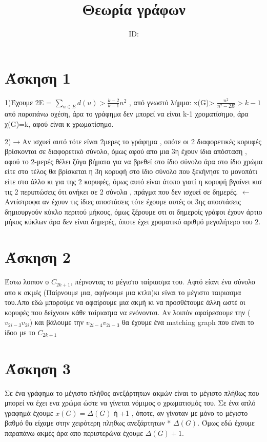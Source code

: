 \documentclass{article}
\title{Θεωρία γράφων \\ \exerciseset}
\author{\studentname \qquad  ID: \suid}
\begin{document}
\maketitle
\section*{Άσκηση 1}
1)Έχουμε 2E = $\sum_{u\in E}d(u) > \frac{k-2}{k-1}n^2 $ , από γνωστό λήμμα: x(G)> $\frac{n^2}{n^2-2E} > k-1$ από παραπάνω σχέση, άρα το γράφημα δεν μπορεί να είναι k-1 χροματίσημο, άρα χ(G)=k, αφού είναι κ χρωματίσημο. 

2)$\rightarrow$Αν ισχυεί αυτό τότε είναι 2μερες το γράφημα , οπότε οι 2 διαφορετικές κορυφές βρίσκονται σε διαφορετικό σύνολο, όμως αφού απο μια 3η έχουν ίδια απόσταση , αφού το 2-μερές θέλει ζύγα βήματα για να βρεθεί στο ίδιο σύνολο άρα στο ίδιο χρώμα είτε στο τέλος θα βρίσκεται η 3η κορυφή στο ίδιο σύνολο που ξεκήνησε το μονοπάτι είτε στο άλλο κι για της 2 κορυφές, όμως αυτό είναι άτοπο γιατί η κορυφή βγαίνει κισ τις 2 περιπτώσεις ότι ανήκει σε 2 σύνολα , πράγμα που δεν ισχυεί σε δημερές.
$\leftarrow$ Αντίστροφα αν έχουν τις ίδιες αποστάσεις τότε έχουμε αυτές οι 3ης αποστάσεις δημιουργούν κύκλο περιτού μήκους, όμως ξέρουμε οτι οι δημεροίς γράφοι έχουν άρτιο μήκος κύκλων άρα δεν είναι δημερές, όποτε έχει χροματικό αριθμό μεγαλήτερο του 2.

\section*{Άσκηση 2}
Έστω λοιπον ο $C_{2k+1}$, πέρνοντας το μέγιστο ταίριασμα του. Αφτό είανι ένα σύνολο απο κ ακμές (Παίρνουμε μια, αφήνουμε μια κτλπ)κι είναι το μέγιστο ταιριασμα του.Απο εδώ μπορούμε να αφαίρουμε μια ακμή κι να προσθέτουμε άλλη ωστέ οι κορυφές που δείχνουν κάθε ταίριασμα να ενόνονται. Αν λοιπόν αφαίρεσουμε την ($v_{2i-3}v_{2i}$) και βάλουμε την $v_{2i-4}v_{2i-3}$ θα έχουμε ένα matching graph που είναι το ίδοο με το $C_{2k+1}$
\section*{Άσκηση 3}
Σε ένα γράφημα το μέγιστο πλήθος ανεξάρτητων ακμών είναι το μέγιστο πλήθως που μπορεί να έχει ενα χρώμα ώστε να γίνεται νόμιμος ο χρωματισμός του. Σε ένα απλό γραφημά έχουμε $x(G)=\Delta(G)$ ή +1 , όποτε, αν γίνοταν με μόνο το μέγιστο βαθμό θα είχαμε στην χειρότερη πληθως ανεξάρτητων * $\Delta(G)$. Όμως εδώ έχουμε παραπάνω ακμές άρα απο περιστερώνα έχουμε $\Delta(G)+1$.
\end{document}
